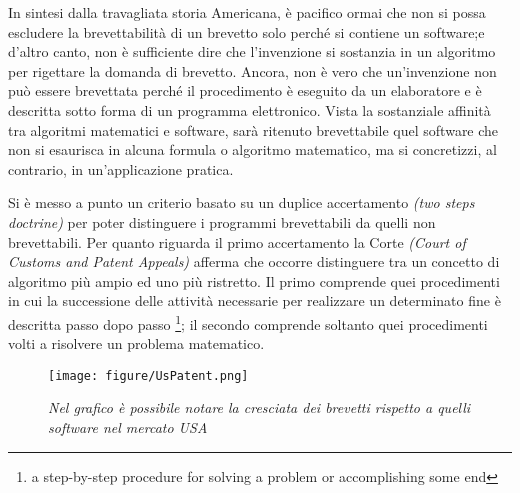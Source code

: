 In sintesi dalla travagliata storia Americana, è pacifico ormai che non si possa escludere la brevettabilità di un brevetto solo perché si contiene un software;e d'altro canto, non è sufficiente dire che l'invenzione si sostanzia in un algoritmo per rigettare la domanda di brevetto. Ancora, non è vero che un'invenzione non può essere brevettata perché il procedimento è eseguito da un elaboratore e è descritta sotto forma di un programma elettronico. Vista la sostanziale affinità tra algoritmi matematici e software, sarà ritenuto brevettabile quel software che non si esaurisca in alcuna formula o algoritmo matematico, ma si concretizzi, al contrario, in un'applicazione pratica.

Si è messo a punto un criterio basato su un duplice accertamento \textit{(two steps doctrine)} per poter distinguere i programmi brevettabili da quelli non brevettabili. Per quanto riguarda il primo accertamento la Corte \textit{(Court of Customs and Patent Appeals)} afferma che occorre distinguere tra un concetto di algoritmo più ampio ed uno più ristretto. Il primo comprende quei procedimenti in cui la successione delle attività necessarie per realizzare un determinato fine è descritta passo dopo passo \footnote{a step-by-step procedure for solving a problem or accomplishing some end}; il secondo comprende soltanto quei procedimenti volti a risolvere un problema matematico.




\begin{figure}[bh]
	\begin{center}
		\texttt{[image: figure/UsPatent.png]}
	\end{center}
	\caption{\textit{Nel grafico è possibile notare la cresciata dei brevetti rispetto a quelli software nel mercato USA}}
\end{figure}

